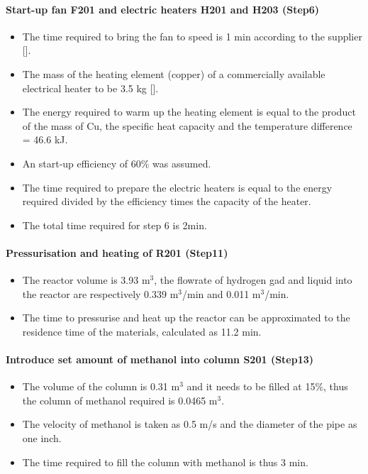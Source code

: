 \paragraph{Start-up fan F201 and electric heaters H201 and H203 (Step6)}
\begin{itemize}
        \item The time required to bring the fan to speed is 1 min according to the supplier [].
        \item The mass of the heating element (copper) of a commercially available electrical heater to be 3.5 kg [].
        \item The energy required to warm up the heating element is equal to the product of the mass of Cu, the specific heat capacity and the temperature difference = 46.6 kJ.
        \item An start-up efficiency of 60\% was assumed.
        \item The time required to prepare the electric heaters is equal to the energy required divided by the efficiency times the capacity of the heater. 
        \item The total time required for step 6 is 2min.
    \end{itemize}
    
\paragraph{Pressurisation and heating of R201 (Step11)}
\begin{itemize}
    \item The reactor volume is 3.93 m$^3$, the flowrate of hydrogen gad and liquid into the reactor are respectively 0.339 m$^3$/min and 0.011  m$^3$/min.
    \item The time to pressurise and heat up the reactor can be approximated to the residence time of the materials, calculated as 11.2 min.
\end{itemize}

\paragraph{Introduce set amount of methanol into column S201 (Step13)}
\begin{itemize}
    \item The volume of the column is 0.31 m$^3$ and it needs to be filled at 15\%, thus the column of methanol required is 0.0465 m$^3$.
    \item The velocity of methanol is taken as 0.5 m/s and the diameter of the pipe as one inch.
    \item The time required to fill the column with methanol is thus 3 min.
\end{itemize}



